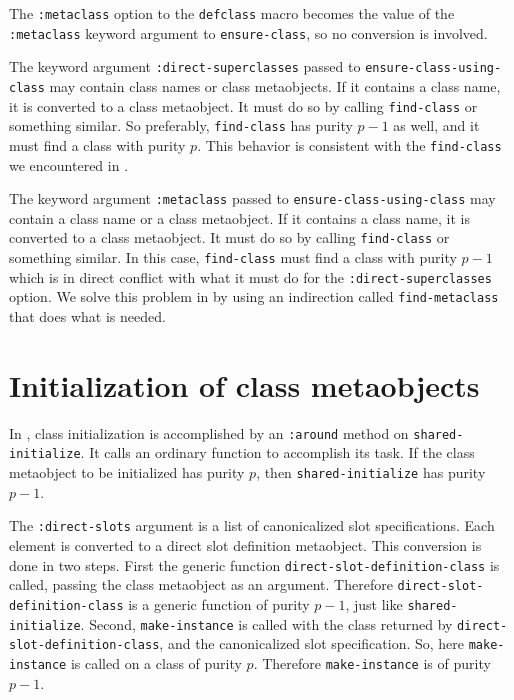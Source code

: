 The \texttt{:metaclass} option to the \texttt{defclass} macro becomes
the value of the \texttt{:metaclass} keyword argument to
\texttt{ensure-class}, so no conversion is involved.

The keyword argument \texttt{:direct-superclasses} passed to
\texttt{ensure-class-using-class} may contain class names or class
metaobjects.  If it contains a class name, it is converted to a class
metaobject.  It must do so by calling \texttt{find-class} or something
similar.  So preferably, \texttt{find-class} has purity $p-1$ as well,
and it must find a class with purity $p$.  This behavior is consistent
with the \texttt{find-class} we encountered in
.

The keyword argument \texttt{:metaclass} passed to
\texttt{ensure-class-using-class} may contain a class name or a class
metaobject.  If it contains a class name, it is converted to a class
metaobject.  It must do so by calling \texttt{find-class} or something
similar.  In this case, \texttt{find-class} must find a class with
purity $p-1$ which is in direct conflict with what it must do for the
\texttt{:direct-superclasses} option.  We solve this problem in
\sysname{} by using an indirection called \texttt{find-metaclass} that
does what is needed.

\section{Initialization of class metaobjects}

In \sysname{}, class initialization is accomplished by an
\texttt{:around} method on \texttt{shared-initialize}.  It calls an
ordinary function to accomplish its task.  If the class metaobject to
be initialized has purity $p$, then \texttt{shared-initialize} has
purity $p-1$.

The \texttt{:direct-slots} argument is a list of canonicalized slot
specifications.  Each element is converted to a direct slot definition
metaobject.  This conversion is done in two steps.  First the generic
function \texttt{direct-slot-definition-class} is called, passing the
class metaobject as an argument.  Therefore
\texttt{direct-slot-definition-class} is a generic function of purity
$p-1$, just like \texttt{shared-initialize}.  Second,
\texttt{make-instance} is called with the class returned by
\texttt{direct-slot-definition-class}, and the canonicalized
slot specification.  So, here \texttt{make-instance} is called on a
class of purity $p$.  Therefore \texttt{make-instance} is of purity
$p-1$.
